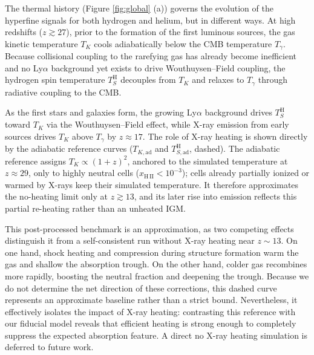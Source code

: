 \documentclass[apj,twocolumn, appendixfloats, twocolappendix, numberedappendix, tighten]{openjournal}
\begin{document}
The thermal history (Figure \ref{fig:global} (a)) governs the evolution of the hyperfine signals for both hydrogen and helium, but in different ways. At high redshifts ($z \gtrsim 27$), prior to the formation of the first luminous sources, the gas kinetic temperature $T_K$ cools adiabatically below the CMB temperature $T_\gamma$. Because collisional coupling to the rarefying gas has already become inefficient and no Ly$\alpha$ background yet exists to drive Wouthuysen--Field coupling, the hydrogen spin temperature $T_S^\mathrm{H}$ decouples from $T_K$ and relaxes to $T_\gamma$ through radiative coupling to the CMB.


As the first stars and galaxies form, the growing Ly$\alpha$ background drives $T_S^\mathrm{H}$ toward $T_K$ via the Wouthuysen--Field effect, while X-ray emission from early sources drives $T_K$ above $T_\gamma$ by $z \approx 17$. The role of X-ray heating is shown directly by the adiabatic reference curves ($T_{K,\mathrm{ad}}$ and $T_{S,\mathrm{ad}}^\mathrm{H}$, dashed). The adiabatic reference assigns $T_K \propto (1+z)^2$, anchored to the simulated temperature at $z \approx 29$, only to highly neutral cells ($x_\mathrm{H\,II} < 10^{-3}$); cells already partially ionized or warmed by X-rays keep their simulated temperature. It therefore approximates the no-heating limit only at $z \gtrsim 13$, and its later rise into emission reflects this partial re-heating rather than an unheated IGM.


This post-processed benchmark is an approximation, as two competing effects distinguish it from a self-consistent run without X-ray heating near $z \sim 13$. On one hand, shock heating and compression during structure formation warm the gas and shallow the absorption trough. On the other hand, colder gas recombines more rapidly, boosting the neutral fraction and deepening the trough. Because we do not determine the net direction of these corrections, this dashed curve represents an approximate baseline rather than a strict bound. Nevertheless, it effectively isolates the impact of X-ray heating: contrasting this reference with our fiducial model reveals that efficient heating is strong enough to completely suppress the expected absorption feature. A direct no X-ray heating simulation is deferred to future work.

\end{document}
